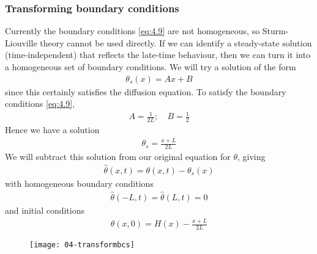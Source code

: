 \subsubsection{Transforming boundary conditions}
Currently the boundary conditions \cref{eq:4.9} are not homogeneous, so Sturm-Liouville theory cannot be used directly.
If we can identify a steady-state solution (time-independent) that reflects the late-time behaviour, then we can turn it into a homogeneous set of boundary conditions.
We will try a solution of the form
\begin{align*}
	\theta_s(x) = Ax + B
\end{align*}
since this certainly satisfies the diffusion equation.
To satisfy the boundary conditions \cref{eq:4.9},
\begin{align*}
	A = \frac{1}{2L};\quad B = \frac{1}{2}
\end{align*}
Hence we have a solution
\begin{align} \label{eq:4.10}
	\theta_s = \frac{x + L}{2L}
\end{align}
We will subtract this solution from our original equation for $\theta$, giving
\begin{align*}
	\hat \theta(x,t) = \theta(x,t) - \theta_s(x)
\end{align*}
with homogeneous boundary conditions
\begin{align*}
	\hat \theta(-L, t) = \hat \theta(L, t) = 0
\end{align*}
and initial conditions
\begin{align} \label{eq:4.11}
	\hat \theta(x,0) = H(x) - \frac{x+L}{2L}
\end{align}

\begin{figure}[h]
    \centering
    \texttt{[image: 04-transformbcs]}
\end{figure}

